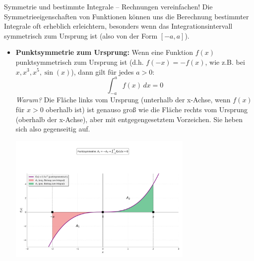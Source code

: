 \begin{infoboxumgebung}{Symmetrie und bestimmte Integrale – Rechnungen vereinfachen!}
Die Symmetrieeigenschaften von Funktionen können uns die Berechnung bestimmter Integrale oft erheblich erleichtern, besonders wenn das Integrationsintervall symmetrisch zum Ursprung ist (also von der Form $[-a, a]$).

\begin{itemize}
    \item \textbf{Punktsymmetrie zum Ursprung:}
        Wenn eine Funktion $f(x)$ punktsymmetrisch zum Ursprung ist (d.h. $f(-x) = -f(x)$, wie z.B. bei $x, x^3, x^5, \sin(x)$), dann gilt für jedes $a>0$:
        \[ \int_{-a}^{a} f(x) \,dx = 0 \]
        \textit{Warum?} Die Fläche links vom Ursprung (unterhalb der x-Achse, wenn $f(x)$ für $x>0$ oberhalb ist) ist genauso groß wie die Fläche rechts vom Ursprung (oberhalb der x-Achse), aber mit entgegengesetztem Vorzeichen. Sie heben sich also gegenseitig auf.
        \begin{center}
            \includegraphics[width=0.7\textwidth]{grafiken/Integral_Punktsymmetrie.png}
            \label{fig:integral_punktsymmetrie}
        \end{center}


\end{itemize}
\end{infoboxumgebung}
